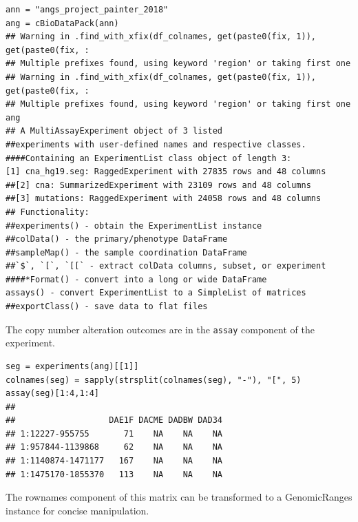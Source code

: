 \begin{verbatim}
ann = "angs_project_painter_2018"
ang = cBioDataPack(ann)
## Warning in .find_with_xfix(df_colnames, get(paste0(fix, 1)), get(paste0(fix, :
## Multiple prefixes found, using keyword 'region' or taking first one
## Warning in .find_with_xfix(df_colnames, get(paste0(fix, 1)), get(paste0(fix, :
## Multiple prefixes found, using keyword 'region' or taking first one
ang
## A MultiAssayExperiment object of 3 listed
##experiments with user-defined names and respective classes.
####Containing an ExperimentList class object of length 3:
[1] cna_hg19.seg: RaggedExperiment with 27835 rows and 48 columns
##[2] cna: SummarizedExperiment with 23109 rows and 48 columns
##[3] mutations: RaggedExperiment with 24058 rows and 48 columns
## Functionality:
##experiments() - obtain the ExperimentList instance
##colData() - the primary/phenotype DataFrame
##sampleMap() - the sample coordination DataFrame
##`$`, `[`, `[[` - extract colData columns, subset, or experiment
####*Format() - convert into a long or wide DataFrame
assays() - convert ExperimentList to a SimpleList of matrices
##exportClass() - save data to flat files
\end{verbatim}

The copy number alteration outcomes are in the
\texttt{assay} component of the experiment.

\begin{Shaded}
\begin{verbatim}
seg = experiments(ang)[[1]]
colnames(seg) = sapply(strsplit(colnames(seg), "-"), "[", 5)
assay(seg)[1:4,1:4]
##
##                   DAE1F DACME DADBW DAD34
## 1:12227-955755       71    NA    NA    NA
## 1:957844-1139868     62    NA    NA    NA
## 1:1140874-1471177   167    NA    NA    NA
## 1:1475170-1855370   113    NA    NA    NA
\end{verbatim}
\end{Shaded}

The rownames component of this matrix can be transformed to
a GenomicRanges instance for concise manipulation.

